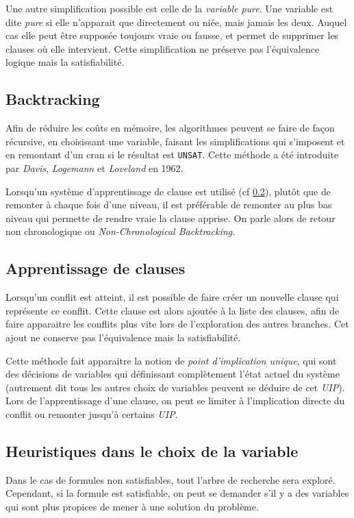 Une autre simplification possible est celle de la \emph{variable pure}. Une
variable est dite \emph{pure} si elle n'apparait que directement ou niée, mais
jamais les deux. Auquel cas elle peut être supposée toujours vraie ou fausse,
et permet de supprimer les clauses où elle intervient. Cette simplification
ne préserve pas l'équivalence logique mais la satisfiabilité.

\subsection{Backtracking}\label{back}
Afin de réduire les coûts en mémoire, les algorithmes peuvent se faire de
façon récursive, en choisissant une variable, faisant les simplifications qui
s'imposent et en remontant d'un cran si le résultat est \texttt{UNSAT}. Cette
méthode a été introduite par \emph{Davis}, \emph{Logemann} et \emph{Loveland}
en 1962\cite{dll62}.

Lorsqu'un système d'apprentissage de clause est utilisé (cf \ref{cdcl}), plutôt
que de remonter à chaque fois d'une niveau, il est préférable de remonter au
plus bas niveau qui permette de rendre vraie la clause apprise. On parle alors
de retour non chronologique ou \emph{Non-Chronological Backtracking}.

\subsection{Apprentissage de clauses}\label{cdcl}
Lorsqu'un conflit est atteint, il est possible de faire créer un nouvelle
clause qui représente ce conflit. Cette clause est alors ajoutée à la liste
des clauses, afin de faire apparaitre les conflits plus vite lors de
l'exploration des autres branches. Cet ajout ne conserve pas l'équivalence
mais la satisfiabilité.

Cette méthode fait apparaitre la notion de \emph{point d'implication unique},
qui sont des décisions de variables qui définissant complètement l'état actuel
du système (autrement dit tous les autres choix de variables peuvent se déduire
de cet \emph{UIP}). Lors de l'apprentissage d'une clause, on peut se limiter
à l'implication directe du conflit ou remonter jusqu'à certains \emph{UIP}.

\subsection{Heuristiques dans le choix de la variable}\label{decision}
Dans le cas de formules non satisfiables, tout l'arbre de recherche sera
exploré. Cependant, si la formule est satisfiable, on peut se demander s'il
y a des variables qui sont plus propices de mener à une solution du problème.

